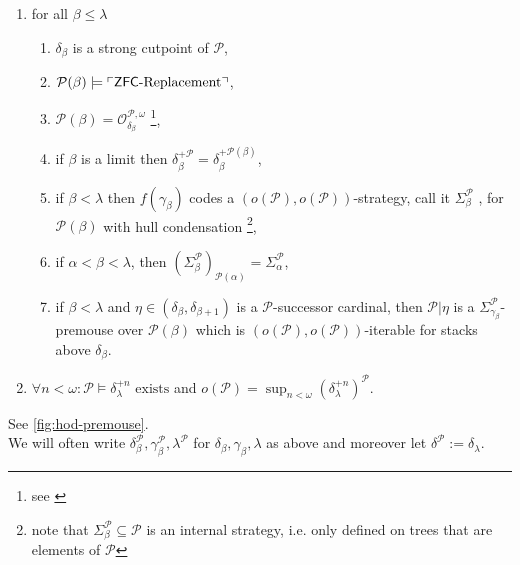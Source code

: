 \documentclass[../main]{subfiles}
\begin{document}
{\begin{enumerate}
  \item for all $\beta \le \lambda$
    \begin{enumerate}      
    \item $\delta_{\beta}$ is a strong cutpoint  of $\mathcal{P}$,
    \item $\mathcal{P}(\beta) \models \ulcorner \textsf{ZFC}\text{-Replacement} \urcorner$,
    \item
      $\mathcal{P}(\beta) = \mathcal{O}^{\mathcal{P},
        \omega}_{\delta_{\beta}}$ \footnote{see
        \cite[Definition~1.26]{sargsyan2015hod}},
    \item if $\beta$ is a limit then
      $\delta_{\beta}^{+\mathcal{P}} = \delta_{\beta}^{+
        \mathcal{P}(\beta)}$,
    \item if $\beta < \lambda$ then $f(\gamma_{\beta})$ codes a
      $(o(\mathcal{P}), o(\mathcal{P}))$-strategy, call it
      $\Sigma^{\mathcal{P}}_{\beta}$ ,
       for $\mathcal{P}(\beta)$
      with hull condensation \footnote{note that
        $\Sigma^{\mathcal{P}}_{\beta} \subseteq \mathcal{P}$ is an
        internal strategy, i.e. only defined on trees that are
        elements of $\mathcal{P}$},
    \item \label{defi:agreement of internal iteration strategy} if $\alpha < \beta < \lambda$, then
      $(\Sigma^{\mathcal{P}}_{\beta})_{\mathcal{P(\alpha)}} =
      \Sigma^{\mathcal{P}}_{\alpha}$, 
    \item if $\beta < \lambda$ and
      $\eta \in (\delta_{\beta}, \delta_{\beta+1})$ is a
      $\mathcal{P}$-successor cardinal, then $\mathcal{P} | \eta$ is a
      $\Sigma^{\mathcal{P}}_{\gamma_{\beta}}$-premouse over
      $\mathcal{P}(\beta)$ which is
      $(o(\mathcal{P}), o(\mathcal{P}))$-iterable for stacks above
      $\delta_{\beta}$.
    \end{enumerate}
  \item
    $\forall n < \omega \colon \mathcal{P} \models
    \delta_{\lambda}^{+n} \text{ exists}$ and
    $o(\mathcal{P}) = \sup_{n < \omega}
    (\delta_{\lambda}^{+n})^{\mathcal{P}}$.
  \end{enumerate}
  See \autoref{fig:hod-premouse}. \\
  We will often write
  $\delta^{\mathcal{P}}_{\beta}, \gamma_{\beta}^{\mathcal{P}},
  \lambda^{\mathcal{P}}$ for $\delta_{\beta}, \gamma_{\beta}, \lambda$
  as above and moreover let
  $\delta^{\mathcal{P}} := \delta_{\lambda}$.  }
\end{document}
